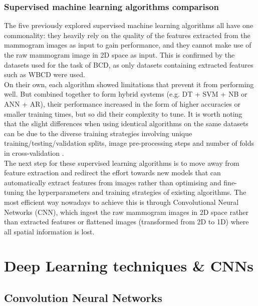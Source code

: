 \subsubsection{Supervised machine learning algorithms comparison}

The five previously explored supervised machine learning algorithms all have one commonality: they heavily rely on the quality of the features extracted from the mammogram images as input to gain performance, and they cannot make use of the raw mammogram image in 2D space as input. This is confirmed by the datasets used for the task of BCD, as only datasets containing extracted features such as WBCD were used.\\

On their own, each algorithm showed limitations that prevent it from performing well. But combined together to form hybrid systems (e.g. DT + SVM + NB or ANN + AR), their performance increased in the form of higher accuracies or smaller training times, but so did their complexity to tune. It is worth noting that the slight differences when using identical algorithms on the same datasets can be due to the diverse training strategies involving unique training/testing/validation splits, image pre-processing steps and number of folds in cross-validation \citep{Yue2018}.\\

The next step for these supervised learning algorithms is to move away from feature extraction and redirect the effort towards new models that can automatically extract features from images rather than optimising and fine-tuning the hyperparameters and training strategies of existing algorithms. The most efficient way nowadays to achieve this is through Convolutional Neural Networks (CNN), which ingest the raw mammogram images in 2D space rather than extracted features or flattened images (transformed from 2D to 1D) where all spatial information is lost.


\section{Deep Learning techniques \& CNNs}
\label{sec:litsurvey-DLtechniques-CNN}

\subsection{Convolution Neural Networks}

